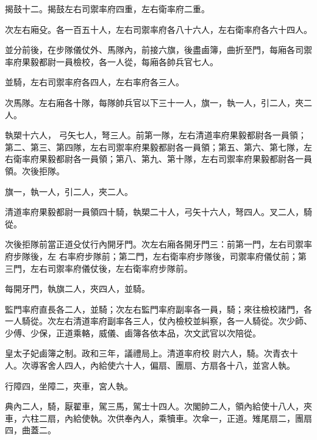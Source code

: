 \begin{pinyinscope}
 揭鼓十二。揭鼓左右司禦率府四重，左右衛率府二重。



 次左右廂殳。各一百五十人，左右司禦率府各八十六人，左右衛率府各六十四人。



 並分前後，在步隊儀仗外、馬隊內，前接六旗，後盡鹵簿，曲折至門，每廂各司禦率府果毅都尉一員檢校，各一人從，每廂各帥兵官七人。



 並騎，左右司禦率府各四人，左右率府各三人。



 次馬隊。左右廂各十隊，每隊帥兵官以下三十一人，旗一，執一人，引二人，夾二人。



 執槊十六人，
 弓矢七人，弩三人。前第一隊，左右清道率府果毅都尉各一員領；第二、第三、第四隊，左右司禦率府果毅都尉各一員領；第五、第六、第七隊，左右衛率府果毅都尉各一員領；第八、第九、第十隊，左右司禦率府果毅都尉各一員領。次後拒隊。



 旗一，執一人，引二人，夾二人。



 清道率府果毅都尉一員領四十騎，執槊二十人，弓矢十六人，弩四人。叉二人，騎從。



 次後拒隊前當正道殳仗行內開牙門。次左右廂各開牙門三：前第一門，左右司禦率府步隊後，左
 右率府步隊前；第二門，左右衛率府步隊後，司禦率府儀仗前；第三門，左右司禦率府儀仗後，左右衛率府步隊前。



 每開牙門，執旗二人，夾四人，並騎。



 監門率府直長各二人，並騎；次左右監門率府副率各一員，騎；來往檢校諸門，各一人騎從。次左右清道率府副率各三人，仗內檢校並糾察，各一人騎從。次少師、少傅、少保，正道乘輅，威儀、鹵簿各依本品，次文武官以次陪從。



 皇太子妃鹵簿之制。政和三年，議禮局上。清道率府校
 尉六人，騎。次青衣十人。次導客舍人四人，內給使六十人，偏扇、團扇、方扇各十八，並宮人執。



 行障四，坐障二，夾車，宮人執。



 典內二人，騎，厭翟車，駕三馬，駕士十四人。次閣帥二人，領內給使十八人，夾車，六柱二扇，內給使執。次供奉內人，乘犢車。次傘一，正道。雉尾扇二，團扇四，曲蓋二。




\end{pinyinscope}
